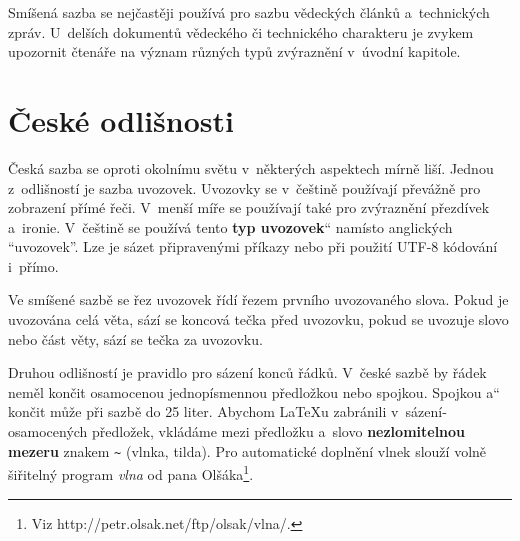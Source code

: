 \documentclass[11pt,a4paper,twocolumn]{article}
\newcommand{\myuv}[1]{\quotedblbase #1\textquotedblleft}
\begin{document}
Smíšená sazba se nejčastěji používá pro sazbu vě\-dec\-kých článků a~technických zpráv. 
U~delší­ch do\-ku\-men\-tů vědeckého či technického charakteru je zvykem upozornit čtenáře na význam různých typů zvýrazně\-ní­ v~úvodní­ kapitole.

\section{České odlišnosti}
Česká sazba se oproti okolnímu světu v~některých as\-pektech mírně liší. Jednou z~odlišností je sazba uvo\-zo\-vek. Uvozovky se v~češtině používají převážně pro zobrazení přímé řeči. V~menší míře se používají také pro zvýraznění přezdívek a~ironie. V~češtině se použí\-vá tento \myuv{\textbf {typ uvozovek}} namísto anglických ``uvo\-zovek''. Lze je sázet připravenými příkazy nebo při použití UTF-8 kódování i~přímo.

Ve smíšené sazbě se řez uvozovek řídí řezem prv\-ní\-ho uvozovaného slova. Pokud je uvozována celá věta, sází se koncová tečka před uvozovku, pokud se uvozuje slovo nebo část věty, sází se tečka za uvozovku.

Druhou odlišností je pravidlo pro sázení­ konců řádků. V~české sazbě by řádek neměl končit osamoce\-nou jednopí­smennou předložkou nebo spojkou. Spoj\-kou \myuv{a} končit může při sazbě do 25 liter. 
Abychom \LaTeX{}u zabránili v~sázení­ osamocených předložek, vkládáme mezi předložku a~slovo \textbf{nezlomitelnou mezeru} znakem \verb|~| (vlnka, tilda). Pro automatické do\-plnění vlnek slouží­ volně šiřitelný program \emph{vlna} od pana Olšáka\footnote{Viz http://petr.olsak.net/ftp/olsak/vlna/.}.
\end{document}
